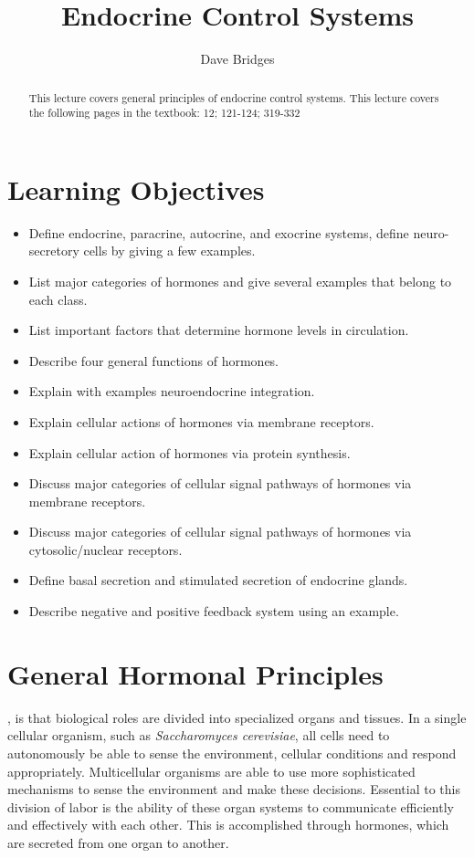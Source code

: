 \documentclass{tufte-handout}
\title{Endocrine Control Systems}
\author{Dave Bridges}
\begin{document}
\maketitle%

\begin{abstract}
\noindent This lecture covers general principles of endocrine control systems.  This lecture covers the following pages in the textbook: 12; 121-124; 319-332 \cite{Widmaier2013}
\end{abstract}

\section{Learning Objectives}
\begin{itemize}
\item Define endocrine, paracrine, autocrine, and exocrine systems, define neuro-secretory cells by giving a few examples.
\item List major categories of hormones and give several examples that belong to each class.
\item List important factors that determine hormone levels in circulation.
\item Describe four general functions of hormones.
\item Explain with examples neuroendocrine integration.
\item Explain cellular actions of hormones via membrane receptors.
\item Explain cellular action of hormones via protein synthesis.
\item Discuss major categories of cellular signal pathways of hormones via membrane receptors.
\item Discuss major categories of cellular signal pathways of hormones via cytosolic/nuclear receptors.
\item Define basal secretion and stimulated secretion of endocrine glands.
\item Describe negative and positive feedback system using an example.
\end{itemize}

\section{General Hormonal Principles}
, is that biological roles are divided into specialized organs and tissues.  In a single cellular organism, such as \textit{Saccharomyces cerevisiae}, all cells need to autonomously be able to sense the environment, cellular conditions and respond appropriately.  Multicellular organisms are able to use more sophisticated mechanisms to sense the environment and make these decisions.  Essential to this division of labor is the ability of these organ systems to communicate efficiently and effectively with each other.  This is accomplished through hormones, which are secreted from one organ to another.
\end{document}
